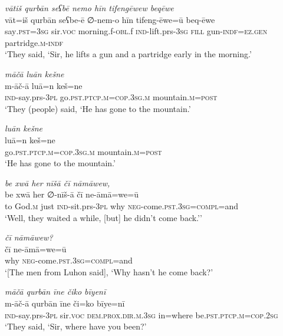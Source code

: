 \ea \label{ŠJ.17}
\textit{vātiš qurbān seʕbē nemo hīn tifengēwew beqēwe} \\ 
\gll vāt=iš qurbān seʕbe-ē ∅-nem-o hīn tifeng-ēwe=ū beq-ēwe \\ 
 say\textsc{.pst}\textsc{=3sg} sir.\textsc{voc} morning.f\textsc{-obl}.f \textsc{ind-}lift.prs\textsc{-3sg} \textsc{fill} gun\textsc{-indf}\textsc{=ez.gen} partridge\textsc{.m}\textsc{-indf} \\ 
\glt `They said, ‘Sir, he lifts a gun and a partridge early in the morning.'
\z 
 
\ea \label{ŠJ.23}
\textit{māčā luān kešne} \\ 
\gll m-āč-ā luā=n keš=ne \\ 
 \textsc{ind-}say.prs\textsc{-3pl} go\textsc{.pst}\textsc{.ptcp}\textsc{.m}\textsc{=cop}\textsc{.3sg}\textsc{.m} mountain\textsc{.m}\textsc{=\textsc{post}} \\ 
\glt `They (people) said, ‘He has gone to the mountain.'
\z 
 
\ea \label{ŠJ.24}
\textit{luān kešne} \\ 
\gll luā=n keš=ne \\ 
 go\textsc{.pst}\textsc{.ptcp}\textsc{.m}\textsc{=cop}\textsc{.3sg}\textsc{.m} mountain\textsc{.m}\textsc{=\textsc{post}} \\ 
\glt `He has gone to the mountain.'
\z 
 
\ea \label{ŠJ.25}
\textit{be xwā her nīšā čī nāmāwew,} \\ 
\gll be xwā her ∅-nīš-ā čī ne-āmā=we=ū \\ 
 to God\textsc{.m} just \textsc{ind-}sit.prs\textsc{-3pl} why \textsc{neg-}come\textsc{.pst}\textsc{.3sg}\textsc{=compl}=and \\ 
\glt `Well, they waited a while, [but] he didn’t come back.’'
\z 
 
\ea \label{ŠJ.26}
\textit{čī nāmāwew?} \\ 
\gll čī ne-āmā=we=ū \\ 
 why \textsc{neg-}come\textsc{.pst}\textsc{.3sg}\textsc{=compl}=and \\ 
\glt `[The men from Luhon said], ‘Why hasn’t he come back?'
\z 
 
\ea \label{ŠJ.30}
\textit{māčā qurbān īne čiko bīyenī} \\ 
\gll m-āč-ā qurbān īne či=ko bīye=nī \\ 
 \textsc{ind-}say.prs\textsc{-3pl} sir.\textsc{voc} \textsc{dem.prox}\textsc{.dir}\textsc{.m}\textsc{.3sg} in=where be\textsc{.pst}\textsc{.ptcp}\textsc{.m}\textsc{=cop}\textsc{.\textsc{2sg}} \\ 
\glt `They said, ‘Sir, where have you been?'
\z 
 
